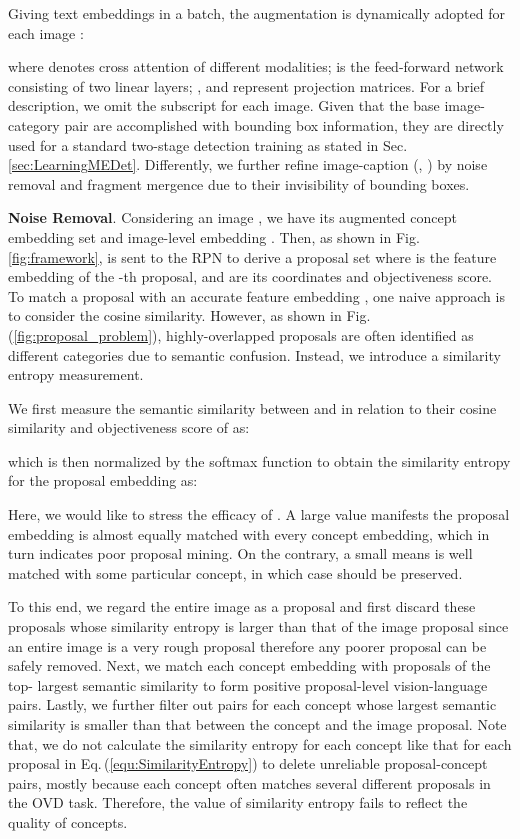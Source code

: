 \documentclass[10pt,twocolumn,letterpaper]{article}
\begin{document}
Giving text embeddings   in a batch, the augmentation is dynamically adopted for each image :

where  denotes cross attention of different modalities;  is the feed-forward network consisting of two linear layers; ,  and  represent projection matrices. For a brief description, we omit the subscript  for each image.
Given that the base image-category pair  are accomplished with bounding box information, they are directly used for a standard two-stage detection training as stated in Sec.\,\ref{sec:LearningMEDet}.
Differently, we further refine image-caption (, ) by noise removal and fragment mergence due to their invisibility of bounding boxes.



\textbf{Noise Removal}.
Considering an image , we have its augmented concept embedding set  and image-level embedding . Then, as shown in Fig.\,\ref{fig:framework},  is sent to the RPN to derive a proposal set  where  is the feature embedding of the -th proposal,  and  are its coordinates and objectiveness score. To match a proposal  with an accurate feature embedding , one naive approach is to consider the cosine similarity. However, as shown in Fig.\,(\ref{fig:proposal_problem}), highly-overlapped proposals are often identified as different categories due to semantic confusion. Instead, we introduce a similarity entropy measurement.


We first measure the semantic similarity between  and  in relation to their cosine similarity and objectiveness score of  as:

which is then normalized by the softmax function to obtain the similarity entropy for the proposal embedding  as:





Here, we would like to stress the efficacy of . A large  value manifests the proposal embedding  is almost equally matched with every concept embedding, which in turn indicates poor proposal mining.
On the contrary, a small  means  is well matched with some particular concept, in which case  should be preserved.

To this end, we regard the entire image as a proposal and first discard these proposals whose similarity entropy is larger than that of the image proposal since an entire image is a very rough proposal therefore any poorer proposal can be safely removed. Next, we match each concept embedding  with proposals of the top- largest semantic similarity to form positive proposal-level vision-language pairs. 
Lastly, we further filter out pairs for each concept whose largest semantic similarity is smaller than that between the concept and the image proposal.
Note that, we do not calculate the similarity entropy for each concept like that for each proposal in Eq.\,(\ref{equ:SimilarityEntropy}) to delete  unreliable proposal-concept pairs, mostly because each concept often matches several different proposals in the OVD task. Therefore, the value of similarity entropy fails to reflect the quality of concepts.
\end{document}
